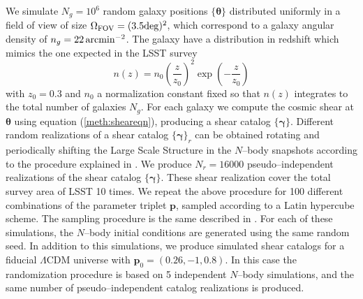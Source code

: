 \documentclass[reprint,aps,prd,superscriptaddress,showkeys,showpacs]{revtex4-1}
\newcommand{\bb}[1]{\mathbf{#1}}
\begin{document}
%
We simulate $N_g = 10^6$ random galaxy positions $\{\pmb{\theta}\}$ distributed uniformly in a field of view of size $\Omega_{\rm FOV}=(3.5{\rm deg})^2$, which correspond to a galaxy angular density of $n_g=22\,\rm{arcmin}^{-2}$. The galaxy have a distribution in redshift which mimics the one expected in the LSST survey
\begin{equation}
n(z) = n_0\left(\frac{z}{z_0}\right)^2\exp\left(-\frac{z}{z_0}\right)
\end{equation}  
%
with $z_0=0.3$ and $n_0$ a normalization constant fixed so that $n(z)$ integrates to the total number of galaxies $N_g$. For each galaxy we compute the cosmic shear at $\pmb{\theta}$ using equation (\ref{meth:sheareqn}), producing a shear catalog $\{\pmb{\gamma}\}$. Different random realizations of a shear catalog $\{\pmb{\gamma}\}_r$ can be obtained rotating and periodically shifting the Large Scale Structure in the $N$--body snapshots according to the procedure explained in \citep{PetriVariance}. We produce $N_r=16000$ pseudo--independent realizations of the shear catalog $\{\pmb{\gamma}\}$. These shear realization cover the total survey area of LSST 10 times.
We repeat the above procedure for 100 different combinations of the parameter triplet $\bb{p}$, sampled according to a Latin hypercube scheme. The sampling procedure is the same described in \citep{CFHTMink,CFHTPeaks}. For each of these simulations, the $N$--body initial conditions are generated using the same random seed. In addition to this simulations, we produce simulated shear catalogs for a fiducial $\Lambda$CDM universe with $\bb{p}_0=(0.26,-1,0.8)$. In this case the randomization procedure is based on 5 independent $N$--body simulations, and the same number of pseudo--independent catalog realizations is produced.    
\end{document}
